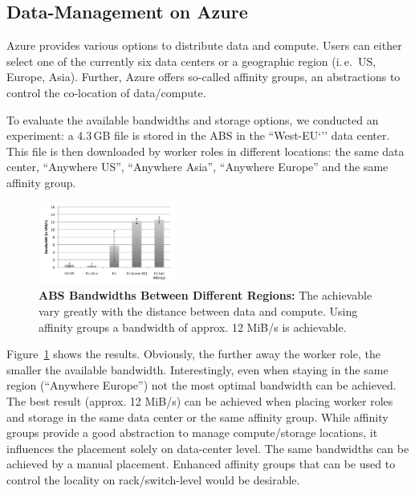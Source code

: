 \documentclass[conference,final]{IEEEtran}
\newcommand{\up}{\vspace*{-1em}}
\newcommand{\alnote}[1]{ {\textcolor{blue} { ***AL: #1 }}}
\newcommand{\jhanote}[1]{ {\textcolor{red} { ***SJ: #1 }}}
\newcommand{\alnote}[1]{}
\newcommand{\jhanote}[1]{}
\begin{document}
\subsection{Data-Management on Azure}
\up
Azure provides various options to distribute data and
compute. Users can either select one of the currently six data centers or 
a geographic region (i.\,e.\ US, Europe, Asia). Further, Azure offers 
so-called affinity groups, an abstractions to control 
the co-location of data/compute.

To evaluate the available bandwidths and storage options, we conducted
an experiment: a 4.3\,GB file is stored in the ABS in 
the ``West-EU`'' data center. This file is then
downloaded by worker roles in different locations: the same data center,
``Anywhere US'', ``Anywhere Asia'', ``Anywhere Europe'' and 
the same affinity group.


\begin{figure}[t]
    \centering
        \includegraphics[width=0.4\textwidth]{performance/azure-data-transfer.pdf}
        \caption{\textbf{ABS Bandwidths Between
            Different Regions:} The achievable vary greatly with the
          distance between data and compute. Using affinity groups a
          bandwidth of approx. 12 MiB/s is achievable.}
    \label{fig:performance_azure-data-transfer}
    \up\up
\end{figure}
Figure~\ref{fig:performance_azure-data-transfer} shows the results. 
Obviously, the further away the worker role, the smaller
the available bandwidth. Interestingly, even when staying in the same
region (``Anywhere Europe'') not the most optimal bandwidth can be
achieved. The best result (approx. 12 MiB/s) can be achieved when
placing worker roles and storage in the same data center or the 
same affinity group. While affinity groups provide a good abstraction
to manage compute/storage locations, it influences the placement
solely on data-center level. The same bandwidths can be achieved by 
a manual placement. Enhanced affinity groups that can be used
to control the locality on rack/switch-level would be desirable.
\end{document}
